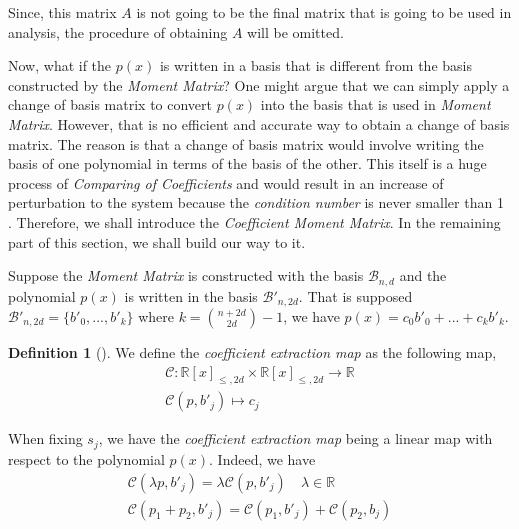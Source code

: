 \documentclass[12pt]{amsart}
\numberwithin{equation}{section}
\theoremstyle{definition}
\newtheorem{definition}[thm]{Definition}
\numberwithin{thm}{section}
\begin{document}
Since, this matrix $A$ is not going to be the final matrix that is going to be used in analysis, the procedure of obtaining $A$ will be omitted. 

\smallskip

Now, what if the $p(x)$ is written in a basis that is different from the basis constructed by the \emph{Moment Matrix}?
One might argue that we can simply apply a change of basis matrix to convert $p(x)$ into the basis that is used in \emph{Moment Matrix}. 
However, that is no efficient and accurate way to obtain a change of basis matrix. 
The reason is that a change of basis matrix would involve writing the basis of one polynomial in terms of the basis of the other. 
This itself is a huge process of \emph{Comparing of Coefficients} and would result in an increase of perturbation to the system because the \emph{condition number} is never smaller than 1 \cite{golub1996matrix}.
Therefore, we shall introduce the \emph{Coefficient Moment Matrix}. In the remaining part of this section, we shall build our way to it.

Suppose the \emph{Moment Matrix} is constructed with the basis $\mathcal{B}_{n, d}$ and the polynomial $p(x)$ is written in the basis $\mathcal{B}'_{n, 2d}$. 
That is supposed $\mathcal{B}'_{n, 2d} = \{b'_0, ..., b'_k\}$ where $k = {n + 2d \choose 2d} - 1$, we have $p(x) = c_0b'_0 + ... + c_kb'_k$.
\begin{definition}[\cite{Recher:Masterthesis}]
     \label{def:cem}
We define the \emph{coefficient extraction map} as the following map,
\begin{equation*}
     \begin{split}
     \mathcal{C}: \mathbb{R}[x]_{\leq, 2d} \times \mathbb{R}[x]_{\leq, 2d} \rightarrow \mathbb{R} \\
     \mathcal{C}(p, b'_j) \mapsto c_j
     \end{split}
\end{equation*}
\end{definition}

\smallskip
When fixing $s_j$, we have the \emph{coefficient extraction map} being a linear map with respect to the polynomial $p(x)$. Indeed, we have 
\begin{equation*}
     \begin{split}
          \mathcal{C}(\lambda p, b'_j) = \lambda \mathcal{C}(p, b'_j) \quad \lambda \in \mathbb{R}
          \\
          \mathcal{C}(p_1 + p_2, b'_j) = \mathcal{C}(p_1, b'_j) + \mathcal{C}(p_2, b_j)
     \end{split}
\end{equation*}
\end{document}
